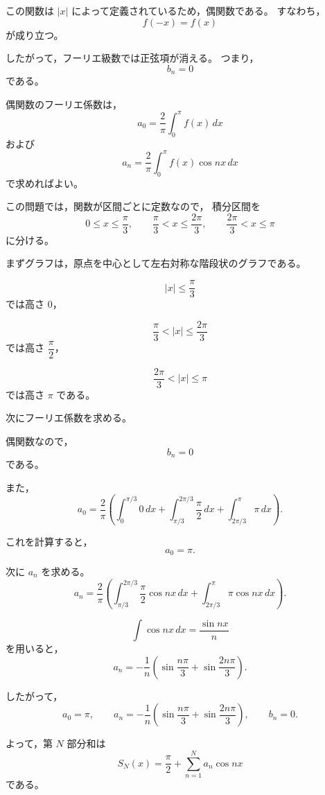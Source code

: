 \begin{background}
	この関数は \(|x|\) によって定義されているため，偶関数である。
	すなわち，
	\[
	f(-x)=f(x)
	\]
	が成り立つ。
	
	したがって，フーリエ級数では正弦項が消える。
	つまり，
	\[
	b_n=0
	\]
	である。
	
	偶関数のフーリエ係数は，
	\[
	a_0=\frac{2}{\pi}\int_{0}^{\pi}f(x)\,dx
	\]
	および
	\[
	a_n=\frac{2}{\pi}\int_{0}^{\pi}f(x)\cos nx\,dx
	\]
	で求めればよい。
	
	この問題では，関数が区間ごとに定数なので，
	積分区間を
	\[
	0\leq x\leq \frac{\pi}{3},
	\qquad
	\frac{\pi}{3}<x\leq \frac{2\pi}{3},
	\qquad
	\frac{2\pi}{3}<x\leq \pi
	\]
	に分ける。
\end{background}
\begin{strategy}
	まずグラフは，原点を中心として左右対称な階段状のグラフである。
	
	\[
	|x|\leq \frac{\pi}{3}
	\]
	では高さ \(0\)，
	
	\[
	\frac{\pi}{3}<|x|\leq \frac{2\pi}{3}
	\]
	では高さ \(\dfrac{\pi}{2}\)，
	
	\[
	\frac{2\pi}{3}<|x|\leq \pi
	\]
	では高さ \(\pi\)
	である。
	
	次にフーリエ係数を求める。
	
	偶関数なので，
	\[
	b_n=0
	\]
	である。
	
	また，
	\[
	a_0
	=
	\frac{2}{\pi}
	\left(
	\int_{0}^{\pi/3}0\,dx
	+
	\int_{\pi/3}^{2\pi/3}\frac{\pi}{2}\,dx
	+
	\int_{2\pi/3}^{\pi}\pi\,dx
	\right).
	\]
	
	これを計算すると，
	\[
	a_0=\pi.
	\]
	
	次に \(a_n\) を求める。
	\[
	a_n
	=
	\frac{2}{\pi}
	\left(
	\int_{\pi/3}^{2\pi/3}\frac{\pi}{2}\cos nx\,dx
	+
	\int_{2\pi/3}^{\pi}\pi\cos nx\,dx
	\right).
	\]
	
	\[
	\int \cos nx\,dx=\frac{\sin nx}{n}
	\]
	を用いると，
	\[
	a_n
	=
	-\frac{1}{n}
	\left(
	\sin\frac{n\pi}{3}
	+
	\sin\frac{2n\pi}{3}
	\right).
	\]
	
	したがって，
	\[
	a_0=\pi,
	\qquad
	a_n
	=
	-\frac{1}{n}
	\left(
	\sin\frac{n\pi}{3}
	+
	\sin\frac{2n\pi}{3}
	\right),
	\qquad
	b_n=0.
	\]
	
	よって，第 \(N\) 部分和は
	\[
	S_N(x)
	=
	\frac{\pi}{2}
	+
	\sum_{n=1}^{N}
	a_n\cos nx
	\]
	である。
\end{strategy}
